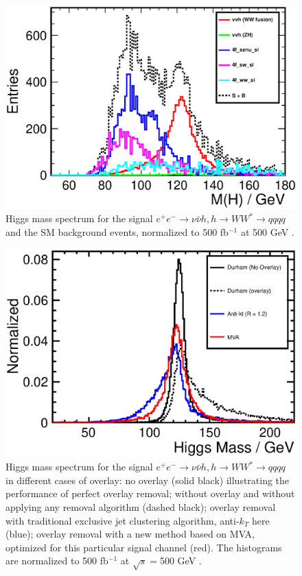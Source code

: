 \begin{figure}
\begin{center}
\includegraphics[width=0.85\hsize]{chapters/figures/vvH_WW4j500_MassH.eps}
\end{center}
  \caption{Higgs mass spectrum for the signal $e^+e^-\to\nu\bar\nu h, h\to WW^{*}\to qqqq$
  and the SM background events, normalized to 500 fb$^{-1}$
  at 500 GeV \cite{Durig:2014lfa}.}
  \label{fig:vvHWW500}
\end{figure}

\begin{figure}
\begin{center}
\includegraphics[width=0.85\hsize]{chapters/figures/vvH_WW4j500_Overlay.eps}
\end{center}
  \caption{Higgs mass spectrum for the signal $e^+e^-\to\nu\bar\nu h, h\to WW^{*}\to qqqq$
   in different cases of overlay: no overlay (solid black) 
  illustrating the performance of perfect overlay removal; without overlay and without
  applying any removal algorithm (dashed black); overlay removal with traditional 
  exclusive jet clustering algorithm, anti-$k_T$ here (blue); overlay removal with a new
  method based on MVA, optimized for this particular signal channel (red). The histograms 
  are normalized to 500 fb$^{-1}$ at $\sqrt{s}=$500 GeV \cite{Durig:2014lfa}.}
  \label{fig:vvHWW500ovl}
\end{figure}

